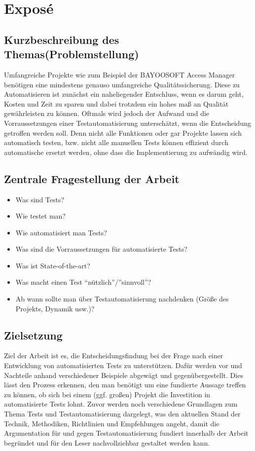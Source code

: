 \chapter{Exposé}
\label{ch:expose}
%
\section{Kurzbeschreibung des Themas(Problemstellung)}
Umfangreiche Projekte wie zum Beispiel der BAYOOSOFT Access Manager benötigen eine mindestens genauso umfangreiche Qualitätssicherung. Diese zu Automatisieren ist zunächst ein naheliegender Entschluss, wenn es darum geht, Kosten und Zeit zu sparen und dabei trotzdem ein hohes maß an Qualität gewährleisten zu können. Oftmals wird jedoch der Aufwand und die Vorraussetzungen einer Testautomatisierung unterschätzt, wenn die Entscheidung getroffen werden soll. Denn nicht alle Funktionen oder gar Projekte lassen sich automatisch testen, bzw. nicht alle manuellen Tests können effizient durch automatische ersetzt werden, ohne dass die Implementierung zu aufwändig wird.
\section{Zentrale Fragestellung der Arbeit}
\begin{itemize}
    \item Was sind Tests?
    \item Wie testet man?
    \item Wie automatisiert man Tests?
    \item Was sind die Vorraussetzungen für automatisierte Tests?
    \item Was ist State-of-the-art?
    \item Was macht einen Test “nützlich”/”sinnvoll”?
    \item Ab wann sollte man über Testautomatisierung nachdenken (Größe des Projekts, Dynamik usw.)?
\end{itemize}
\section{Zielsetzung}
    Ziel der Arbeit ist es, die Entscheidungsfindung bei der Frage nach einer Entwicklung von automatisierten Tests zu unterstützen. Dafür werden vor und Nachteile anhand verschiedener Beispiele abgewägt und gegenübergestellt. Dies lässt den Prozess erkennen, den man benötigt um eine fundierte Aussage treffen zu können, ob sich bei einem (ggf. großen) Projekt die Investition in automatisierte Tests lohnt. Zuvor werden noch verschiedene Grundlagen zum Thema Tests und Testautomatisierung dargelegt, was den aktuellen Stand der Technik, Methodiken, Richtlinien und Empfehlungen angeht, damit die Argumentation für und gegen Testautomatisierung fundiert innerhalb der Arbeit begründet und für den Leser nachvollziehbar gestaltet werden kann.

